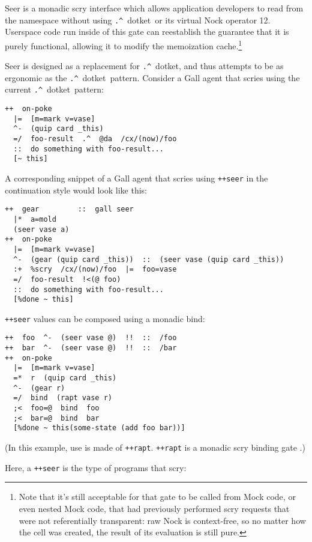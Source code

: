 \documentclass[twoside]{article}
\newcommand{\dotket}{\texttt{\string.\string^}~dotket}
\begin{document}
Seer is a monadic scry interface which allows application developers to read from the namespace without using \dotket~or its virtual Nock operator 12.  Userspace code run inside of this gate can reestablish the guarantee that it is purely functional, allowing it to modify the memoization cache.\footnote{Note that it's still acceptable for that gate to be called from Mock code, or even nested Mock code, that had previously performed scry requests that were not referentially transparent:  raw Nock is context-free, so no matter how the \texttt{} cell was created, the result of its evaluation is still pure.}

Seer is designed as a replacement for \dotket, and thus attempts to be as ergonomic as the \dotket~pattern.  Consider a Gall agent that scries using the current \dotket~pattern:

\begin{lstlisting}
++  on-poke
  |=  [m=mark v=vase]
  ^-  (quip card _this)
  =/  foo-result  .^  @da  /cx/(now)/foo
  ::  do something with foo-result...
  [~ this]
\end{lstlisting}

A corresponding snippet of a Gall agent that scries using \texttt{++seer} in the continuation style would look like this:

\begin{lstlisting}
++  gear         ::  gall seer
  |*  a=mold
  (seer vase a)
++  on-poke
  |=  [m=mark v=vase]
  ^-  (gear (quip card _this))  ::  (seer vase (quip card _this))
  :+  %scry  /cx/(now)/foo  |=  foo=vase
  =/  foo-result  !<(@ foo)
  ::  do something with foo-result...
  [%done ~ this]
\end{lstlisting}

\texttt{++seer} values can be composed using a monadic bind:

\begin{lstlisting}
++  foo  ^-  (seer vase @)  !!  ::  /foo
++  bar  ^-  (seer vase @)  !!  ::  /bar
++  on-poke
  |=  [m=mark v=vase]
  =*  r  (quip card _this)
  ^-  (gear r)
  =/  bind  (rapt vase r)
  ;<  foo=@  bind  foo
  ;<  bar=@  bind  bar
  [%done ~ this(some-state (add foo bar))]
\end{lstlisting}

\noindent
(In this example, use is made of \texttt{++rapt}.  \texttt{++rapt} is a monadic scry binding gate \citep{Levan2023b}.)

Here, a \texttt{++seer} is the type of programs that scry:
\end{document}
